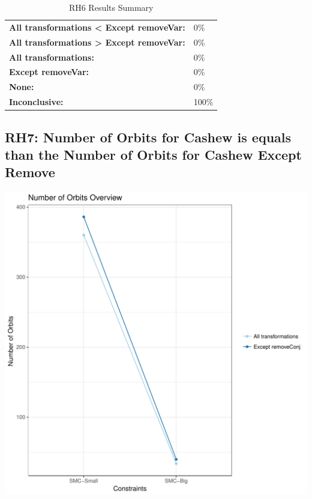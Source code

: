 \documentclass{article}\usepackage[]{graphicx}\usepackage[]{color}
\makeatletter
\def\maxwidth{ %
  \ifdim\Gin@nat@width>\linewidth
    \linewidth
  \else
    \Gin@nat@width
  \fi
}
\newenvironment{knitrout}{}{} %
\makeatother
\begin{document}
	\begin{table}[H]
	\centering
	\caption{RH6 Results Summary}
	\begin{tabular}{ll}
	\textbf{All transformations \textless{} Except removeVar:}& 0\% \\
	\textbf{All transformations \textgreater{} Except removeVar:}& 0\%\\
	\textbf{All transformations:} & 0\%\\
	\textbf{Except removeVar:} & 0\%\\
	\textbf{None:}& 0\%\\
	\textbf{Inconclusive:}& 100\%
			
	
	\end{tabular}
	\end{table}
	
	
	



\subsection{RH7: Number of Orbits for Cashew is equals than the Number of Orbits for Cashew Except Remove}


 
\begin{knitrout}
\color{fgcolor}
\includegraphics[width=\maxwidth]{figure/overview_RH7-1} 

\end{knitrout}
 	
\end{document}
